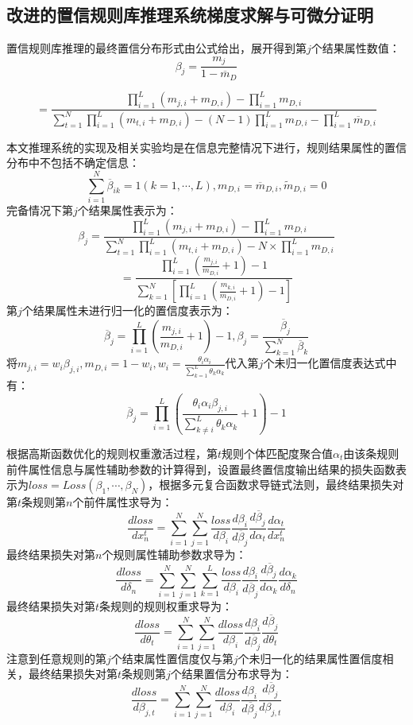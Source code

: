 \documentclass{cjc}
\begin{document}
\subsection{改进的置信规则库推理系统梯度求解与可微分证明}
置信规则库推理的最终置信分布形式由公式给出，展开得到第$j$个结果属性数值：
$$\beta_j=\frac{m_j}{1-\overline{m}_D}$$
\begin{small}
    $$=\frac{\prod_{i=1}^L(m_{j,i}+m_{D,i})-\prod_{i=1}^Lm_{D,i}}{\sum_{t=1}^N\prod_{i=1}^L(m_{t,i}+m_{D,i})-(N-1)\prod_{i=1}^Lm_{D,i}-\prod_{i=1}^L\overline{m}_{D,i}}$$
\end{small}
本文推理系统的实现及相关实验均是在信息完整情况下进行，规则结果属性的置信分布中不包括不确定信息：
$$\sum_{i=1}^N\overline{\beta}_{ik}=1(k=1,\cdots,L),m_{D,i}=\overline{m}_{D,i},\widetilde{m}_{D,i}=0$$
完备情况下第$j$个结果属性表示为：
$$\beta_j=\frac{\prod_{i=1}^L(m_{j,i}+m_{D,i})-\prod_{i=1}^Lm_{D,i}}{\sum_{t=1}^N\prod_{i=1}^L(m_{t,i}+m_{D,i})-N\times\prod_{i=1}^Lm_{D,i}}$$
$$=\frac{\prod_{i=1}^L(\frac{m_{j,i}}{m_{D,i}}+1)-1}{\sum_{k=1}^N[\prod_{i=1}^L(\frac{m_{k,i}}{m_{D,i}}+1)-1]}$$
第$j$个结果属性未进行归一化的置信度表示为：
$$\overline{\beta}_j=\prod_{i=1}^L(\frac{m_{j,i}}{m_{D,i}}+1)-1,\beta_j=\frac{\overline{\beta}_j}{\sum_{k=1}^N\overline{\beta}_k}$$
将$m_{j,i}=w_i\beta_{j,i},m_{D,i}=1-w_i,w_i=\frac{\theta_i\alpha_i}{\sum_{k=1}^L\theta_k\alpha_k}$代入第$j$个未归一化置信度表达式中有：
$$\overline{\beta}_j=\prod_{i=1}^L(\frac{\theta_i\alpha_i\beta_{j,i}}{\sum_{k\neq i}^L{\theta_k\alpha_k}}+1)-1$$

根据高斯函数优化的规则权重激活过程，第$t$规则个体匹配度聚合值$\alpha_t$由该条规则前件属性信息与属性辅助参数的计算得到，设置最终置信度输出结果的损失函数表示为$loss=Loss(\beta_1,\cdots,\beta_N)$，根据多元复合函数求导链式法则，最终结果损失对第$t$条规则第$n$个前件属性求导为：
$$\frac{dloss}{dx_n^t}=\sum_{i=1}^N\sum_{j=1}^N \frac{loss}{d\beta_i}\frac{d\beta_i}{d\overline{\beta}_j}\frac{d\overline{\beta}_j}{d\alpha_t}\frac{d\alpha_t}{dx_n^t}$$
最终结果损失对第$n$个规则属性辅助参数求导为：
$$\frac{dloss}{d\delta_n}=\sum_{i=1}^N\sum_{j=1}^N\sum_{k=1}^L \frac{loss}{d\beta_i}\frac{d\beta_i}{d\overline{\beta}_j}\frac{d\overline{\beta}_j}{d\alpha_k}\frac{d\alpha_k}{d\delta_n}$$
最终结果损失对第$t$条规则的规则权重求导为：
$$\frac{dloss}{d\theta_t}=\sum_{i=1}^N\sum_{j=1}^N \frac{dloss}{d\beta_i}\frac{d\beta_i}{d\overline{\beta}_j}\frac{d\overline{\beta}_j}{d\theta_t}$$
注意到任意规则的第$j$个结束属性置信度仅与第$j$个未归一化的结果属性置信度相关，最终结果损失对第$t$条规则第$j$个结果置信分布求导为：
$$\frac{dloss}{d\beta_{j,t}}=\sum_{i=1}^N\sum_{j=1}^N\frac{dloss}{d\beta_i}\frac{d\beta_i}{d\overline{\beta}_j}\frac{d\overline{\beta}_j}{d\beta_{j,t}}$$
\end{document}

